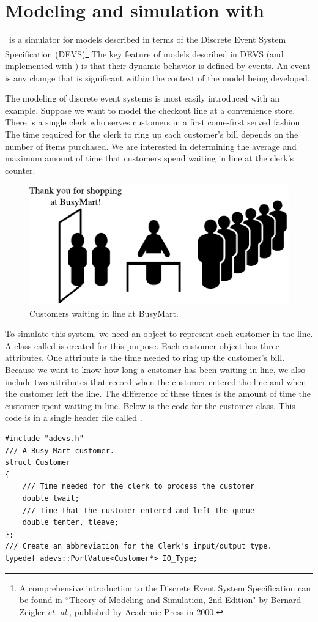 \chapter{Modeling and simulation with \adevs}
\label{chapter:intro}
\adevs\ is a simulator for models described in terms of the Discrete Event System Specification (DEVS)\footnote{A comprehensive introduction to the Discrete Event System Specification can be found in ``Theory of Modeling and Simulation, 2nd Edition" by Bernard Zeigler \textit{et. al.}, published by Academic Press in 2000.} The key feature of models described in DEVS (and implemented with \adevs) is that their dynamic behavior is defined by events. An event is any change that is significant within the context of the model being developed.

The modeling of discrete event systems is most easily introduced with an example. Suppose we want to model the checkout line at a convenience store. There is a single clerk who serves customers in a first come-first served fashion. The time required for the clerk to ring up each customer's bill depends on the number of items purchased. We are interested in determining the average and maximum amount of time that customers spend waiting in line at the clerk's counter.
\begin{figure}[ht]
\centering
\includegraphics{intro_figs/busy_mart.pdf}
\caption{Customers waiting in line at BusyMart.}
\label{fig:busy_mart}
\end{figure}

To simulate this system, we need an object to represent each customer in the line. A class called  is created for this purpose. Each customer object has three attributes. One attribute is the time needed to ring up the customer's bill. Because we want to know how long a customer has been waiting in line, we also include two attributes that record when the customer entered the line and when the customer left the line. The difference of these times is the amount of time the customer spent waiting in line. Below is the code for the customer class. This code is in a single header file called .
\begin{verbatim}
#include "adevs.h"
/// A Busy-Mart customer.
struct Customer
{
    /// Time needed for the clerk to process the customer
    double twait;
    /// Time that the customer entered and left the queue
    double tenter, tleave;
};
/// Create an abbreviation for the Clerk's input/output type.
typedef adevs::PortValue<Customer*> IO_Type;
\end{verbatim}

